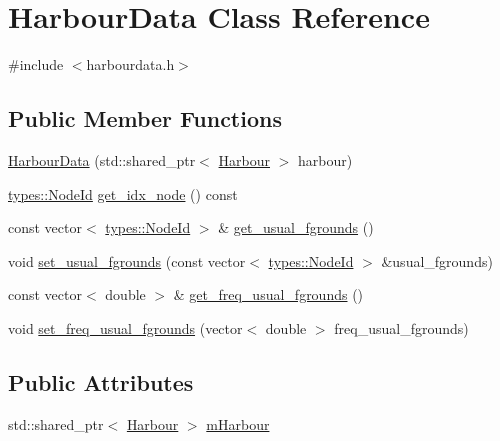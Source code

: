 \hypertarget{class_harbour_data}{}\section{Harbour\+Data Class Reference}
\label{class_harbour_data}


{\ttfamily \#include $<$harbourdata.\+h$>$}

\subsection*{Public Member Functions}
\begin{DoxyCompactItemize}
\item 
\mbox{\hyperlink{class_harbour_data_abdaa6f67f8c6969ecd89cb2d9ba32c96}{Harbour\+Data}} (std\+::shared\+\_\+ptr$<$ \mbox{\hyperlink{class_harbour}{Harbour}} $>$ harbour)
\item 
\mbox{\hyperlink{classtypes_1_1_node_id}{types\+::\+Node\+Id}} \mbox{\hyperlink{class_harbour_data_a73b0b5eaaf08545f9905723f5078de62}{get\+\_\+idx\+\_\+node}} () const
\item 
const vector$<$ \mbox{\hyperlink{classtypes_1_1_node_id}{types\+::\+Node\+Id}} $>$ \& \mbox{\hyperlink{class_harbour_data_a585ad4e0d5323b8454656cfa0351dcab}{get\+\_\+usual\+\_\+fgrounds}} ()
\item 
void \mbox{\hyperlink{class_harbour_data_aa31a224969f9a21d3f3dc4680568097e}{set\+\_\+usual\+\_\+fgrounds}} (const vector$<$ \mbox{\hyperlink{classtypes_1_1_node_id}{types\+::\+Node\+Id}} $>$ \&usual\+\_\+fgrounds)
\item 
const vector$<$ double $>$ \& \mbox{\hyperlink{class_harbour_data_a073b5aadf1f11bfae38abd3464f707f8}{get\+\_\+freq\+\_\+usual\+\_\+fgrounds}} ()
\item 
void \mbox{\hyperlink{class_harbour_data_a16e99d5d14c4478b48be1ef89e790525}{set\+\_\+freq\+\_\+usual\+\_\+fgrounds}} (vector$<$ double $>$ freq\+\_\+usual\+\_\+fgrounds)
\end{DoxyCompactItemize}
\subsection*{Public Attributes}
\begin{DoxyCompactItemize}
\item 
std\+::shared\+\_\+ptr$<$ \mbox{\hyperlink{class_harbour}{Harbour}} $>$ \mbox{\hyperlink{class_harbour_data_a035af9a2d8f393581d9376b136ef0136}{m\+Harbour}}
\end{DoxyCompactItemize}


